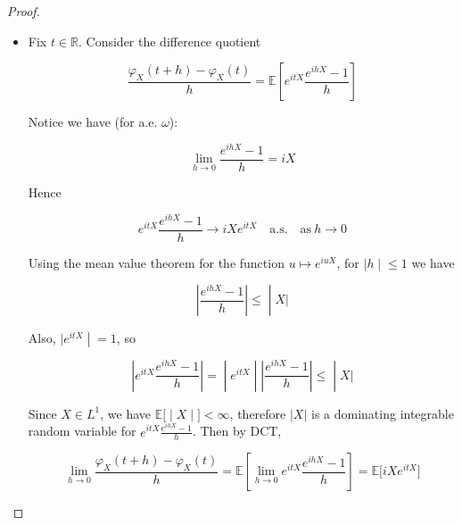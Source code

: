 \begin{proof}

\begin{itemize}
\item
  Fix \(\mathit{t} \in \mathbb{R}\). Consider the difference quotient

  \[\frac{\mathit{\varphi}_{\mathit{X}}(\mathit{t} + h) - \mathit{\varphi}_{\mathit{X}}(\mathit{t})}{h} = \mathbb{E}\left\lbrack {\mathit{e}^{\mathit{i}\mathit{t}\mathit{X}}\frac{\mathit{e}^{\mathit{i}h\mathit{X}} - 1}{h}} \right\rbrack\]

  Notice we have (for a.e. \(\mathit{\omega}\)):

  \[\lim\limits_{h\rightarrow 0}\frac{\mathit{e}^{\mathit{i}h\mathit{X}} - 1}{h} = \mathit{i}\mathit{X}\]

  Hence

  \[\mathit{e}^{\mathit{i}\mathit{t}\mathit{X}}\frac{\mathit{e}^{\mathit{i}h\mathit{X}} - 1}{h}\rightarrow\mathit{i}\mathit{X}\mathit{e}^{\mathit{i}\mathit{t}\mathit{X}}\quad\text{a.s.}\quad\text{as}\ h\rightarrow 0\]

  Using the mean value theorem for the function \(\mathit{u}\mapsto\mathit{e}^{\mathit{i}\mathit{u}\mathit{X}}\), for \(\left. |h \middle| \leq 1 \right.\) we have

  \[\left. \left| \frac{\mathit{e}^{\mathit{i}h\mathit{X}} - 1}{h} \right| \leq \middle| \mathit{X}| \right.\]

  Also, \(\left. |\mathit{e}^{\mathit{i}\mathit{t}\mathit{X}} \middle| = 1 \right.\), so

  \[\left. \left| {\mathit{e}^{\mathit{i}\mathit{t}\mathit{X}}\frac{\mathit{e}^{\mathit{i}h\mathit{X}} - 1}{h}} \right| = \middle| \mathit{e}^{\mathit{i}\mathit{t}\mathit{X}} \middle| \left| \frac{\mathit{e}^{\mathit{i}h\mathit{X}} - 1}{h} \right| \leq \middle| \mathit{X}| \right.\]

  Since \(\mathit{X} \in \mathit{L}^{1}\), we have \(\left. \mathbb{E}\lbrack \middle| \mathit{X} \middle| \rbrack < \infty \right.\), therefore \(|\mathit{X}|\) is a dominating integrable random variable for \(\mathit{e}^{\mathit{i}\mathit{t}\mathit{X}}\frac{\mathit{e}^{\mathit{i}h\mathit{X}} - 1}{h}\). Then by DCT,

  \[\lim\limits_{h\rightarrow 0}\frac{\mathit{\varphi}_{\mathit{X}}(\mathit{t} + h) - \mathit{\varphi}_{\mathit{X}}(\mathit{t})}{h} = \mathbb{E}\left\lbrack {\lim\limits_{h\rightarrow 0}\mathit{e}^{\mathit{i}\mathit{t}\mathit{X}}\frac{\mathit{e}^{\mathit{i}h\mathit{X}} - 1}{h}} \right\rbrack = \mathbb{E}\lbrack\mathit{i}\mathit{X}\mathit{e}^{\mathit{i}\mathit{t}\mathit{X}}\rbrack\]


\end{itemize}
\end{proof}
